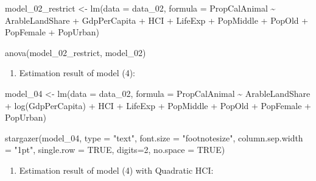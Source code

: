 \documentclass[
  letterpaper,
  DIV=11,
  numbers=noendperiod]{scrartcl}
\newenvironment{Shaded}{\begin{snugshade}}{\end{snugshade}}
\newcommand{\AttributeTok}[1]{\textcolor[rgb]{0.40,0.45,0.13}{#1}}
\newcommand{\ConstantTok}[1]{\textcolor[rgb]{0.56,0.35,0.01}{#1}}
\newcommand{\DecValTok}[1]{\textcolor[rgb]{0.68,0.00,0.00}{#1}}
\newcommand{\FunctionTok}[1]{\textcolor[rgb]{0.28,0.35,0.67}{#1}}
\newcommand{\NormalTok}[1]{\textcolor[rgb]{0.00,0.23,0.31}{#1}}
\newcommand{\OtherTok}[1]{\textcolor[rgb]{0.00,0.23,0.31}{#1}}
\newcommand{\SpecialCharTok}[1]{\textcolor[rgb]{0.37,0.37,0.37}{#1}}
\newcommand{\StringTok}[1]{\textcolor[rgb]{0.13,0.47,0.30}{#1}}
\providecommand{\tightlist}{%
  \setlength{\itemsep}{0pt}\setlength{\parskip}{0pt}}\usepackage{longtable,booktabs,array}
\begin{document}
\begin{Shaded}
\begin{Highlighting}[]
\NormalTok{model\_02\_restrict }\OtherTok{\textless{}{-}} \FunctionTok{lm}\NormalTok{(}\AttributeTok{data =}\NormalTok{ data\_02, }
                        \AttributeTok{formula =}\NormalTok{ PropCalAnimal }\SpecialCharTok{\textasciitilde{}}\NormalTok{ ArableLandShare }\SpecialCharTok{+} 
\NormalTok{                          GdpPerCapita }\SpecialCharTok{+}\NormalTok{ HCI }\SpecialCharTok{+}\NormalTok{ LifeExp }\SpecialCharTok{+} 
\NormalTok{                          PopMiddle }\SpecialCharTok{+}\NormalTok{ PopOld }\SpecialCharTok{+}\NormalTok{ PopFemale }\SpecialCharTok{+}\NormalTok{ PopUrban) }

\FunctionTok{anova}\NormalTok{(model\_02\_restrict, model\_02)}
\end{Highlighting}
\end{Shaded}

\begin{enumerate}
\def\labelenumi{\arabic{enumi}.}
\setcounter{enumi}{5}
\tightlist
\item
  Estimation result of model (4):
\end{enumerate}

\begin{Shaded}
\begin{Highlighting}[]
\NormalTok{model\_04 }\OtherTok{\textless{}{-}} \FunctionTok{lm}\NormalTok{(}\AttributeTok{data =}\NormalTok{ data\_02, }
               \AttributeTok{formula =}\NormalTok{ PropCalAnimal }\SpecialCharTok{\textasciitilde{}}\NormalTok{ ArableLandShare }\SpecialCharTok{+} \FunctionTok{log}\NormalTok{(GdpPerCapita) }
               \SpecialCharTok{+}\NormalTok{ HCI }\SpecialCharTok{+}\NormalTok{ LifeExp }\SpecialCharTok{+}\NormalTok{ PopMiddle }\SpecialCharTok{+}\NormalTok{ PopOld }\SpecialCharTok{+}\NormalTok{ PopFemale }\SpecialCharTok{+}\NormalTok{ PopUrban)}

\FunctionTok{stargazer}\NormalTok{(model\_04, }\AttributeTok{type =} \StringTok{"text"}\NormalTok{, }\AttributeTok{font.size =} \StringTok{"footnotesize"}\NormalTok{, }
          \AttributeTok{column.sep.width =} \StringTok{"1pt"}\NormalTok{, }\AttributeTok{single.row =} \ConstantTok{TRUE}\NormalTok{,}
          \AttributeTok{digits=}\DecValTok{2}\NormalTok{, }\AttributeTok{no.space =} \ConstantTok{TRUE}\NormalTok{)}
\end{Highlighting}
\end{Shaded}

\begin{enumerate}
\def\labelenumi{\arabic{enumi}.}
\setcounter{enumi}{6}
\tightlist
\item
  Estimation result of model (4) with Quadratic HCI:
\end{enumerate}
\end{document}
